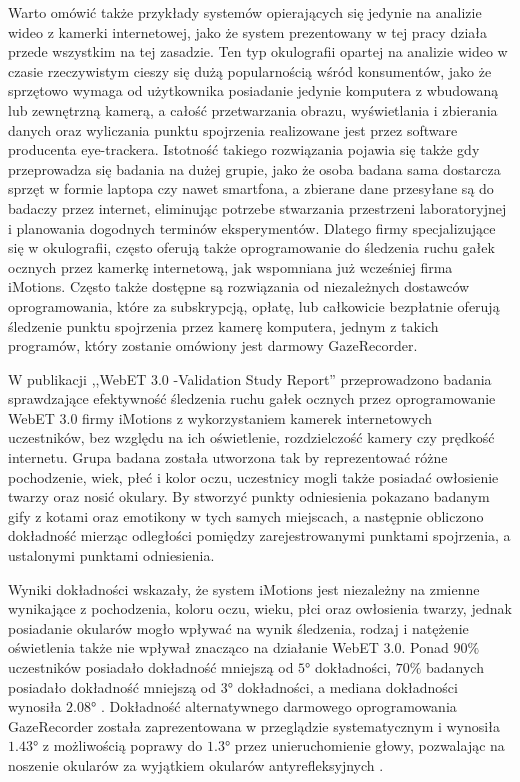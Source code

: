 \documentclass[a4paper,twoside,12pt]{book}
\begin{document}
Warto omówić także przykłady systemów opierających się jedynie na analizie wideo z kamerki internetowej, jako że system prezentowany w tej pracy działa przede wszystkim na tej zasadzie. Ten typ okulografii opartej na analizie wideo w czasie rzeczywistym cieszy się dużą popularnością wśród konsumentów, jako że sprzętowo wymaga od użytkownika posiadanie jedynie komputera z wbudowaną lub zewnętrzną kamerą, a całość przetwarzania obrazu, wyświetlania i zbierania danych oraz wyliczania punktu spojrzenia realizowane jest przez software producenta eye-trackera. Istotność takiego rozwiązania pojawia się także gdy przeprowadza się badania na dużej grupie, jako że osoba badana sama dostarcza sprzęt w formie laptopa czy nawet smartfona, a zbierane dane przesyłane są do badaczy przez internet, eliminując potrzebe stwarzania przestrzeni laboratoryjnej i planowania dogodnych terminów eksperymentów. Dlatego firmy specjalizujące się w okulografii, często oferują także oprogramowanie do śledzenia ruchu gałek ocznych przez kamerkę internetową, jak wspomniana już wcześniej firma iMotions. Często także dostępne są rozwiązania od niezależnych dostawców oprogramowania, które za subskrypcją, opłatę, lub całkowicie bezpłatnie oferują śledzenie punktu spojrzenia przez kamerę komputera, jednym z takich programów, który zostanie omówiony jest darmowy GazeRecorder. 

W publikacji ,,WebET 3.0 -Validation Study Report'' przeprowadzono badania sprawdzające efektywność śledzenia ruchu gałek ocznych przez oprogramowanie WebET 3.0 firmy iMotions z wykorzystaniem kamerek internetowych uczestników, bez względu na ich oświetlenie, rozdzielczość kamery czy prędkość internetu. Grupa badana została utworzona tak by reprezentować różne pochodzenie, wiek, płeć i kolor oczu, uczestnicy mogli także posiadać owłosienie twarzy oraz nosić okulary. By stworzyć punkty odniesienia pokazano badanym gify z kotami oraz emotikony w tych samych miejscach, a następnie obliczono dokładność mierząc odległości pomiędzy zarejestrowanymi punktami spojrzenia, a ustalonymi punktami odniesienia. 

Wyniki dokładności wskazały, że system iMotions jest niezależny na zmienne wynikające z pochodzenia, koloru oczu, wieku, płci oraz owłosienia twarzy, jednak posiadanie okularów mogło wpływać na wynik śledzenia, rodzaj i natężenie oświetlenia także nie wpływał znacząco na działanie WebET 3.0. Ponad $90\%$ uczestników posiadało dokładność mniejszą od $\ang{5}$ dokładności, $70\%$ badanych posiadało dokładność mniejszą od $\ang{3}$ dokładności, a mediana dokładności wynosiła $\ang{2.08}$ \cite{bib:iMotions-WebET}. Dokładność alternatywnego darmowego oprogramowania GazeRecorder została zaprezentowana w przeglądzie systematycznym i wynosiła $\ang{1,43}$ z możliwością poprawy do $\ang{1,3}$ przez unieruchomienie głowy, pozwalając na noszenie okularów za wyjątkiem okularów antyrefleksyjnych \cite{bib:GazeRecorder-Review}. 
\end{document}
